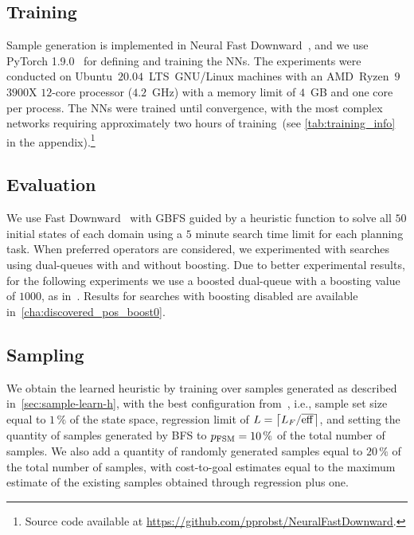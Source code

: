 \documentclass[ppgc,diss,english]{iiufrgs}
\providecommand{\ceil}[1]{\ensuremath{\left\lceil #1\right\rceil}}
\begin{document}


\subsection{Training}
\label{sec:exp-training}
Sample generation is implemented in Neural Fast Downward~\cite{Ferber.etal/2020a}, and we use PyTorch 1.9.0~\cite{Paszke/2019} for defining and training the NNs. The experiments were conducted on Ubuntu~$20.04$~LTS~GNU/Linux machines with an AMD~Ryzen~$9$~$3900$X $12$-core processor ($4.2$~GHz) with a memory limit of $4$~GB and one core per process. The NNs were trained until convergence, with the most complex networks requiring approximately two hours of training~(see \cref{tab:training_info} in the appendix).\footnote{Source code available at \url{https://github.com/pprobst/NeuralFastDownward}.}

\subsection{Evaluation}
\label{sec:exp-evaluation}
We use Fast Downward~\cite{Helmert/2006} with GBFS guided by a heuristic function to solve all $50$ initial states of each domain using a $5$ minute search time limit for each planning task.
When preferred operators are considered, we experimented with searches using dual-queues with and without boosting. Due to better experimental results, for the following experiments we use a boosted dual-queue with a boosting value of $1000$, as in~\citet{Richter.Helmert/2009}. Results for searches with boosting disabled are available in~\vref{cha:discovered_pos_boost0}.

\subsection{Sampling}
\label{sec:exp-sampling}
We obtain the learned heuristic \hnn by training over samples generated as described in~\cref{sec:sample-learn-h}, with the best configuration from~\citet{Bettker.etal/2022}, i.e., sample set size equal to $1\,\%$ of the state space, regression limit of $L=\ceil{\facts/\overline{\eff}}$, and setting the quantity of samples generated by BFS to $p_{\text{FSM}}=10\,\%$ of the total number of samples. We also add a quantity of randomly generated samples equal to $20\,\%$ of the total number of samples, with cost-to-goal estimates equal to the maximum estimate of the existing samples obtained through regression plus one.
\end{document}
